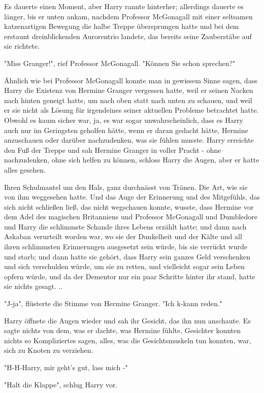 {Es dauerte einen Moment, aber Harry rannte hinterher; allerdings dauerte es länger, bis er unten ankam, nachdem Professor McGonagall mit einer seltsamen katzenartigen Bewegung die halbe Treppe übersprungen hatte und bei dem erstaunt dreinblickenden Aurorentrio landete, das bereits seine Zauberstäbe auf sie richtete.

"Miss Granger!", rief Professor McGonagall. "Können Sie schon sprechen?"

Ähnlich wie bei Professor McGonagall konnte man in gewissem Sinne sagen, dass Harry die Existenz von Hermine Granger vergessen hatte, weil er seinen Nacken nach hinten geneigt hatte, um nach oben statt nach unten zu schauen, und weil er sie nicht als Lösung für irgendeines seiner aktuellen Probleme betrachtet hatte. Obwohl es kaum sicher war, ja, es war sogar unwahrscheinlich, dass es Harry auch nur im Geringsten geholfen hätte, wenn er daran gedacht hätte, Hermine anzuschauen oder darüber nachzudenken, was sie fühlen musste. Harry erreichte den Fuß der Treppe und sah Hermine Granger in voller Pracht - ohne nachzudenken, ohne sich helfen zu können, schloss Harry die Augen, aber er hatte alles gesehen.

Ihren Schulmantel um den Hals, ganz durchnässt von Tränen. Die Art, wie sie von ihm weggesehen hatte. Und das Auge der Erinnerung und des Mitgefühls, das sich nicht schließen ließ, das nicht wegschauen konnte, wusste, dass Hermine vor dem Adel des magischen Britanniens und Professor McGonagall und Dumbledore und Harry die schlimmste Schande ihres Lebens erzählt hatte; und dann nach Askaban verurteilt worden war, wo sie der Dunkelheit und der Kälte und all ihren schlimmsten Erinnerungen ausgesetzt sein würde, bis sie verrückt wurde und starb; und dann hatte sie gehört, dass Harry sein ganzes Geld verschenken und sich verschulden würde, um sie zu retten, und vielleicht sogar sein Leben opfern würde, und da der Dementor nur ein paar Schritte hinter ihr stand, hatte sie nichts gesagt. ..

"J-ja", flüsterte die Stimme von Hermine Granger. "Ich k-kann reden."

Harry öffnete die Augen wieder und sah ihr Gesicht, das ihn nun anschaute. Es sagte nichts von dem, was er dachte, was Hermine fühlte, Gesichter konnten nichts so Kompliziertes sagen, alles, was die Gesichtsmuskeln tun konnten, war, sich zu Knoten zu verziehen.

"H-H-Harry, mir geht's gut, lass mich -"

"Halt die Klappe", schlug Harry vor.

}
